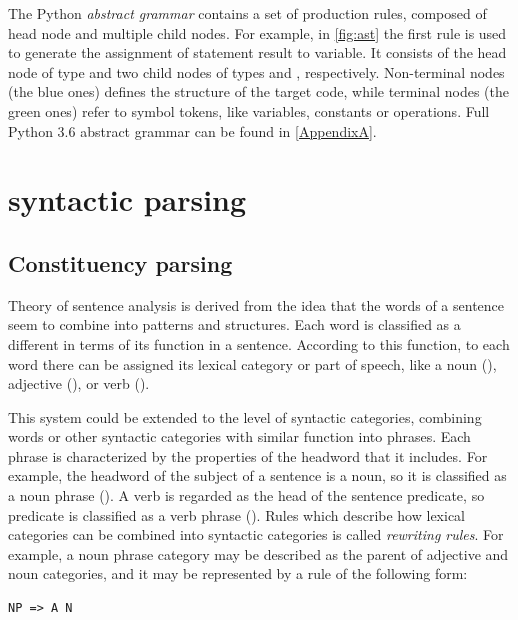 The Python \emph{abstract grammar} contains a set of production rules, composed of head node and multiple child nodes. For example, in \cref{fig:ast} the first rule is used to generate the assignment of statement result to variable. It consists of the head node of type  and two child nodes of types  and , respectively. Non-terminal nodes (the blue ones) defines the  structure of the target code, while terminal nodes (the green ones) refer to symbol tokens, like variables, constants or operations. Full Python 3.6 abstract grammar can be found in  \cref{AppendixA}. 

\section{syntactic parsing}
\subsection{Constituency parsing}
Theory of sentence analysis is derived from the idea that the words of a sentence seem to combine into patterns and structures. Each word is classified as a different in terms of its function in a sentence. According to this function, to each word there can be assigned its lexical category or part of speech, like a noun (), adjective (), or verb (). 

This system could be extended to the level of syntactic categories, combining words or other syntactic categories with similar function into phrases. Each phrase is characterized by the properties of the headword that it includes. For example, the headword of the subject of a sentence is a noun, so it is classified as a noun phrase (). A verb is regarded as the head of the sentence predicate, so predicate is classified as a verb phrase (). Rules which describe how lexical categories can be combined into syntactic categories is called \emph{rewriting rules}. For example, a noun phrase category may be described as the parent of adjective and noun categories, and it may be represented by a rule of the following form:

\begin{verbatim}
NP => A N
\end{verbatim}

